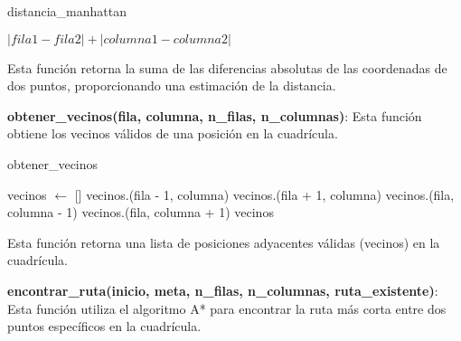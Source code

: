 \documentclass{article}
\begin{document}
\begin{algorithm}[H]
\caption{distancia\_manhattan}
\begin{algorithmic}[1]
    \State \Return $|fila1 - fila2| + |columna1 - columna2|$
\EndProcedure
\end{algorithmic}
\end{algorithm}

Esta función retorna la suma de las diferencias absolutas de las coordenadas de dos puntos, proporcionando una estimación de la distancia.

\textbf{obtener\_vecinos(fila, columna, n\_filas, n\_columnas)}: Esta función obtiene los vecinos válidos de una posición en la cuadrícula.

\begin{algorithm}[H]
\caption{obtener\_vecinos}
\begin{algorithmic}[1]
    \State vecinos $\leftarrow$ []
        \State vecinos.(fila - 1, columna)
    \EndIf
        \State vecinos.(fila + 1, columna)
    \EndIf
        \State vecinos.(fila, columna - 1)
    \EndIf
        \State vecinos.(fila, columna + 1)
    \EndIf
    \State \Return vecinos
\EndProcedure
\end{algorithmic}
\end{algorithm}

Esta función retorna una lista de posiciones adyacentes válidas (vecinos) en la cuadrícula.

\textbf{encontrar\_ruta(inicio, meta, n\_filas, n\_columnas, ruta\_existente)}: Esta función utiliza el algoritmo A* para encontrar la ruta más corta entre dos puntos específicos en la cuadrícula.
\end{document}
